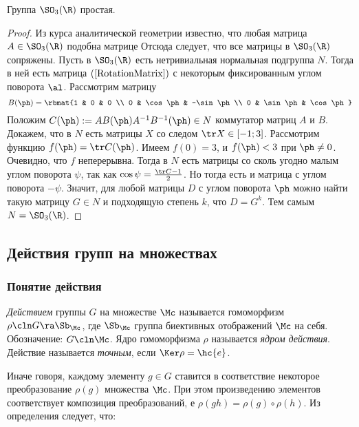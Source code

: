\documentclass[a4paper]{article}
\begin{document}
\begin{theorem}
Группа $\SO_3(\R)$ простая.
\end{theorem}
\begin{proof}
Из курса аналитической геометрии известно, что любая матрица $A \in \SO_3(\R)$ подобна матрице
Отсюда следует, что все матрицы в $\SO_3(\R)$ сопряжены. Пусть в $\SO_3(\R)$ есть нетривиальная нормальная
подгруппа $N$. Тогда в ней есть матрица $(\ref{RotationMatrix})$ с некоторым фиксированным углом поворота $\al$.
Рассмотрим матрицу
$$B(\ph)=\rbmat{1 & 0 & 0 \\ 0 & \cos\ph & -\sin\ph \\ 0 & \sin\ph & \cos\ph}$$
Положим $C(\ph):=A B(\ph)A^{-1}B^{-1}(\ph) \in N$ коммутатор матриц $A$ и $B$. Докажем, что в $N$  есть
матрицы $X$ со следом $\tr X \in [-1;3]$. Рассмотрим функцию $f(\ph) = \tr C(\ph)$. Имеем $f(0) = 3$, и
$f(\ph) < 3$ при $\ph \neq 0$. Очевидно, что $f$ неперерывна. Тогда в $N$ есть матрицы со сколь угодно малым
углом поворота $\psi$, так как $\cos\psi=\frac{\tr C -1}{2}$. Но тогда есть и матрица с углом поворота
$-\psi$. Значит, для любой матрицы $D$ с углом поворота $\ph$ можно найти такую матрицу $G \in N$ и
подходящую степень $k$, что $D=G^k$. Тем самым $N=\SO_3(\R)$.
\end{proof}

\subsection{Действия групп на множествах}

\subsubsection{Понятие действия}

\begin{df}
\emph{Действием} группы $G$ на множестве $\Mc$ называется гомоморфизм $\rho\cln G\ra \Sb_\Mc$, где $\Sb_\Mc$
группа биективных отображений $\Mc$ на себя. Обозначение: $G\cln \Mc$. Ядро гомоморфизма $\rho$ называется
\emph{ядром действия}. Действие называется \emph{точным}, если $\Ker \rho = \hc{e}$.
\end{df}
Иначе говоря, каждому элементу $g \in G$ ставится в соответствие некоторое преобразование $\rho(g)$
множества $\Mc$. При этом произведению элементов соответствует композиция преобразований, е
$\rho(gh)=\rho(g)\circ\rho(h)$. Из определения следует, что:
\end{document}
